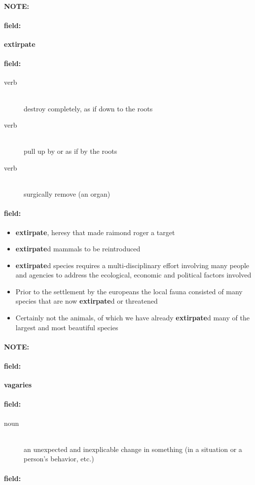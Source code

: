 \documentclass[12pt]{article}
\newenvironment{note}{\paragraph{NOTE:}}{}
\newenvironment{field}{\paragraph{field:}}{}
\begin{document}
\begin{note}
\begin{field}
\textbf{\large extirpate}
\end{field}


\begin{field}
\begin{description}
\item[verb] \hfill \\ 
destroy completely, as if down to the roots

\item[verb] \hfill \\ 
pull up by or as if by the roots

\item[verb] \hfill \\ 
surgically remove (an organ)

\end{description}
\end{field}

\begin{field}
\begin{itemize}
\item \textbf{extirpate}, heresy that made raimond roger a target
\item \textbf{extirpate}d mammals to be reintroduced
\item \textbf{extirpate}d species requires a multi-disciplinary effort involving many people and agencies to address the ecological, economic and political factors involved
\item Prior to the settlement by the europeans the local fauna consisted of many species that are now \textbf{extirpate}d or threatened
\item Certainly not the animals, of which we have already \textbf{extirpate}d many of the largest and most beautiful species
\end{itemize}
\end{field}
\end{note}
\begin{note}
\begin{field}
\textbf{\large vagaries}
\end{field}


\begin{field}
\begin{description}
\item[noun] \hfill \\ 
an unexpected and inexplicable change in something (in a situation or a person's behavior, etc.)

\end{description}
\end{field}

\begin{field}
\end{field}
\end{note}
\end{document}
